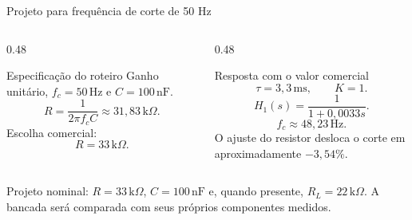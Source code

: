 \begin{frame}{Projeto para frequência de corte de 50 Hz}
  \begin{columns}[T,onlytextwidth]
    \begin{column}{0.48\textwidth}
      \begin{block}{Especificação do roteiro}
        Ganho unitário, $f_c=50\,\mathrm{Hz}$ e $C=100\,\mathrm{nF}$.
        \[
          R=\frac{1}{2\pi f_c C}
          \approx31{,}83\,\mathrm{k}\Omega.
        \]
        Escolha comercial:
        \[
          \boxed{R=33\,\mathrm{k}\Omega}.
        \]
      \end{block}
    \end{column}
    \begin{column}{0.48\textwidth}
      \begin{alertblock}{Resposta com o valor comercial}
        \[
          \tau=3{,}3\,\mathrm{ms},\qquad K=1.
        \]
        \[
          H_1(s)=\frac{1}{1+0{,}0033s}.
        \]
        \[
          f_c\approx48{,}23\,\mathrm{Hz}.
        \]
        O ajuste do resistor desloca o corte em aproximadamente $-3{,}54\%$.
      \end{alertblock}
    \end{column}
  \end{columns}

  \vspace{0.10cm}
  \centering\scriptsize
  Projeto nominal: $R=33\,\mathrm{k}\Omega$, $C=100\,\mathrm{nF}$ e, quando presente,
  $R_L=22\,\mathrm{k}\Omega$. A bancada será comparada com seus próprios componentes medidos.
\end{frame}

